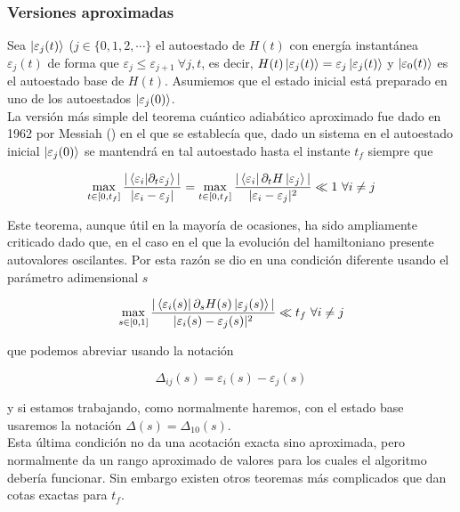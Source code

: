 \documentclass[11pt, spanish]{report}
\numberwithin{equation}{section}
\numberwithin{defin}{section}
\begin{document}
\begin{appendices}
\subsubsection*{Versiones aproximadas}

Sea  $\ket{\varepsilon_j(t)}$ ($j\in\{0,1,2,\cdots\}$ el autoestado de $H(t)$ con energía instantánea $\varepsilon_j(t)$ de forma que $\varepsilon_j\leq\varepsilon_{j+1}\ \forall j,t$, es decir, $H(t)\ket{\varepsilon_j(t)}=\varepsilon_j\ket{\varepsilon_j(t)}$ y $\ket{\varepsilon_0(t)}$ es el autoestado base de $H(t)$. Asumiemos que el estado inicial está preparado en uno de los autoestados $\ket{\varepsilon_j(0)}$.\\

La versión más simple del teorema cuántico adiabático aproximado fue dado en 1962 por Messiah (\cite{messiah1964quantum}) en el que se establecía que, dado un sistema en el autoestado inicial $\ket{\varepsilon_j(0)}$ se mantendrá en tal autoestado hasta el instante $t_f$ siempre que 

\begin{equation}
\max_{t\in[0,t_f]}\frac{|\bra{\varepsilon_i}\ket{\partial_t\varepsilon_j}|}{|\varepsilon_i-\varepsilon_j|}=\max_{t\in[0,t_f]}\frac{|\bra{\varepsilon_i}\partial_tH\ket{\varepsilon_j}|}{|\varepsilon_i-\varepsilon_j|^2} \ll 1\ \forall i\neq j
\end{equation}

Este teorema, aunque útil en la mayoría de ocasiones, ha sido ampliamente criticado dado que, en el caso en el que la evolución del hamiltoniano presente autovalores oscilantes. Por esta razón se dio en \cite{PhysRevLett.102.220401} una condición diferente usando el parámetro adimensional $s$

\begin{equation}
\max_{s\in[0,1]}\frac{|\bra{\varepsilon_i(s)}\partial_sH(s)\ket{\varepsilon_j(s)}|}{|\varepsilon_i(s)-\varepsilon_j(s)|^2} \ll t_f\ \forall i\neq j
\end{equation}

que podemos abreviar usando la notación

\begin{equation}
\Delta_{ij}(s)=\varepsilon_i(s)-\varepsilon_j(s)
\end{equation}

y si estamos trabajando, como normalmente haremos, con el estado base usaremos la notación $\Delta(s)=\Delta_{10}(s)$.\\

Esta última condición no da una acotación exacta sino aproximada, pero normalmente da un rango aproximado de valores para los cuales el algoritmo debería funcionar. Sin embargo existen otros teoremas más complicados que dan cotas exactas para $t_f$.\\


\end{appendices}
\end{document}
